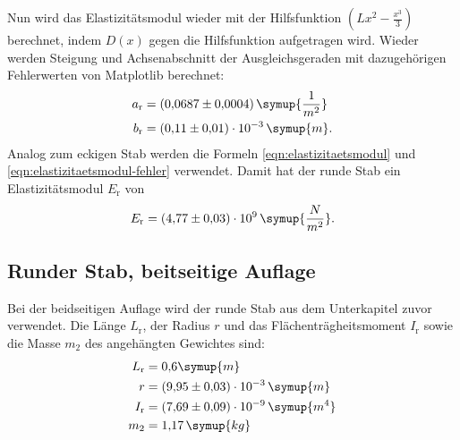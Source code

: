 Nun wird das Elastizitätsmodul wieder mit der Hilfsfunktion $(Lx^2-\frac{x^3}{3})$ berechnet, indem $D(x)$ gegen die Hilfsfunktion aufgetragen wird.
Wieder werden Steigung und Achsenabschnitt der Ausgleichsgeraden mit dazugehörigen Fehlerwerten von Matplotlib berechnet:
\begin{equation*}
\begin{aligned}
a_{\text{r}} &= (0{,}0687 \pm 0{,}0004)\, \symup{\frac{1}{m^2}} \\
b_{\text{r}} &= (0{,}11 \pm 0{,}01)\cdot 10^{-3} \,\symup{m}.
\end{aligned}
\end{equation*}
Analog zum eckigen Stab werden die Formeln \eqref{eqn:elastizitaetsmodul} und \eqref{eqn:elastizitaetsmodul-fehler} verwendet. Damit hat der runde Stab ein
Elastizitätsmodul $E_{\text{r}}$ von
\begin{equation*}
E_{\text{r}} = (4{,}77 \pm 0{,}03)\cdot 10^9 \, \symup{\frac{N}{m^2}}.
\end{equation*}



\pagebreak 

\subsection{Runder Stab, beitseitige Auflage}
Bei der beidseitigen Auflage wird der runde Stab aus dem Unterkapitel zuvor verwendet. Die Länge $L_{\text{r}}$, der Radius $r$ und das Flächenträgheitsmoment $I_{\text{r}}$
sowie die Masse $m_2$ des angehängten Gewichtes sind:
\begin{equation*}
\begin{aligned}
L_{\text{r}} &= 0{,}6 \symup{m} \\
r &= (9{,}95 \pm 0{,}03)\cdot 10^{-3}\, \symup{m} \\
I_{\text{r}} &= (7{,}69 \pm 0{,}09) \cdot 10^{-9} \, \symup{m^4} \\
m_2 &= 1{,}17\, \symup{kg} 
\end{aligned}
\end{equation*}

